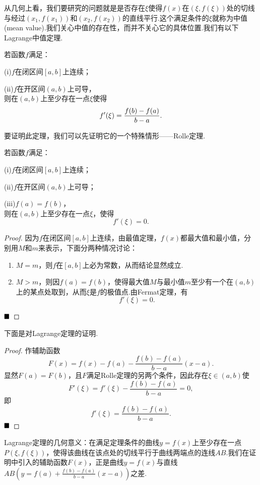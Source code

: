 从几何上看，我们要研究的问题就是是否存在$\xi$使得$f(x)$在$(\xi,f(\xi))$处的切线与经过$(x_1,f(x_1))$和$(x_2,f(x_2))$的直线平行.这个满足条件的$\xi$就称为{\heiti 中值}(mean value).我们关心中值的存在性，而并不关心它的具体位置.我们有以下Lagrange中值定理.
\begin{theorem}[Lagrange中值定理]
	若函数$f$满足：
	
	(i)$f$在闭区间$\left[a,b\right]$上连续；
	
	(ii)$f$在开区间$(a,b)$上可导，\\
	则在$(a,b)$上至少存在一点$\xi$使得
	\begin{equation}{\label{equ:lagrange}}
		f'(\xi)=\frac{f(b)-f(a)}{b-a}.
	\end{equation}
\end{theorem}
要证明此定理，我们可以先证明它的一个特殊情形——Rolle定理.
\begin{theorem}[Rolle定理]
	若函数$f$满足：
	
	(i)$f$在闭区间$\left[a,b\right]$上连续；
	
	(ii)$f$在开区间$(a,b)$上可导；
	
	(iii)$f(a)=f(b)$，\\
	则在$(a,b)$上至少存在一点$\xi$，使得
	$$f'(\xi)=0.$$
\end{theorem}
\begin{proof}
	因为$f$在闭区间$\left[a,b\right]$上连续，由最值定理，$f(x)$都最大值和最小值，分别用$M$和$m$来表示，下面分两种情况讨论：
	\begin{enumerate}
		\item $M=m$，则$f$在$\left[a,b\right]$上必为常数，从而结论显然成立.
		\item $M>m$，则因$f(a)=f(b)$，使得最大值$M$与最小值$m$至少有一个在$(a,b)$上的某点处取到，从而$\xi$是$f$的极值点.由Fermat定理，有
		$$f'(\xi)=0.$$
	\end{enumerate}
	$\hfill\blacksquare$
\end{proof}
下面是对Lagrange定理的证明.
\begin{proof}
	作辅助函数
	$$F(x)=f(x)-f(a)-\frac{f(b)-f(a)}{b-a}(x-a).$$
	显然$F(a)=F(b)$，且$F$满足Rolle定理的另两个条件，因此存在$\xi\in(a,b)$使
	$$F'(\xi)=f'(\xi)-\frac{f(b)-f(a)}{b-a}=0,$$
	即$$f'(\xi)=\frac{f(b)-f(a)}{b-a}.$$
	$\hfill\blacksquare$
\end{proof}

Lagrange定理的几何意义：在满足定理条件的曲线$y=f(x)$上至少存在一点$P(\xi,f(\xi))$，使得该曲线在该点处的切线平行于曲线两端点的连线$AB$.我们在证明中引入的辅助函数$F(x)$，正是曲线$y=f(x)$与直线$AB(y=f(a)+\frac{f(b)-f(a)}{b-a}(x-a))$之差.


